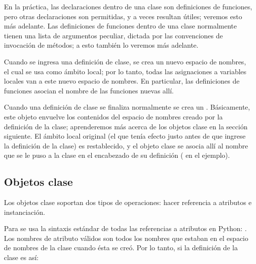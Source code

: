 \documentclass[a4,10pt,spanish]{sphinxmanual}
\begin{document}
\sphinxAtStartPar
En la práctica, las declaraciones dentro de una clase son definiciones de funciones, pero otras declaraciones son permitidas, y a veces resultan útiles; veremos esto más adelante.  Las definiciones de funciones dentro de una clase normalmente tienen una lista de argumentos peculiar, dictada por las convenciones de invocación de métodos; a esto también lo veremos más adelante.

\sphinxAtStartPar
Cuando se ingresa una definición de clase, se crea un nuevo espacio de nombres, el cual se usa como ámbito local; por lo tanto, todas las asignaciones a variables locales van a este nuevo espacio de nombres.  En particular, las definiciones de funciones asocian el nombre de las funciones nuevas allí.

\sphinxAtStartPar
Cuando una definición de clase se finaliza normalmente se crea un .  Básicamente, este objeto envuelve los contenidos del espacio de nombres creado por la definición de la clase; aprenderemos más acerca de los objetos clase en la sección siguiente.  El ámbito local original (el que tenía efecto justo antes de que ingrese la definición de la clase) es restablecido, y el objeto clase se asocia allí al nombre que se le puso a la clase en el encabezado de su definición ( en el ejemplo).


\subsection{Objetos clase}
\label{\detokenize{tutorial/classes:class-objects}}\label{\detokenize{tutorial/classes:tut-classobjects}}
\sphinxAtStartPar
Los objetos clase soportan dos tipos de operaciones: hacer referencia a atributos e instanciación.

\sphinxAtStartPar
Para  se usa la sintaxis estándar de todas las referencias a atributos en Python: .  Los nombres de atributo válidos son todos los nombres que estaban en el espacio de nombres de la clase cuando ésta se creó.  Por lo tanto, si la definición de la clase es así:

\begin{sphinxVerbatim}[commandchars=\\\{\}]
 
      

     
         
\end{sphinxVerbatim}
\end{document}
